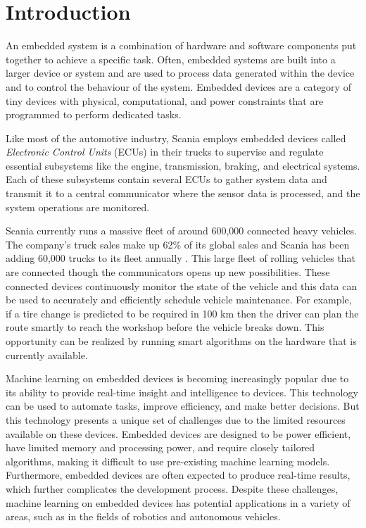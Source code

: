 \part{Introduction}

An embedded system is a combination of hardware and software components put together to achieve a specific task. Often, embedded systems are built into a larger device or system and are used to process data generated within the device and to control the behaviour of the system. Embedded devices are a category of tiny devices with physical, computational, and power constraints that are programmed to perform dedicated tasks.

Like most of the automotive industry, Scania employs embedded devices called \textit{Electronic Control Units} (ECUs) in their trucks to supervise and regulate essential subsystems like the engine, transmission, braking, and electrical systems. Each of these subsystems contain several ECUs to gather system data and transmit it to a central communicator where the sensor data is processed, and the system operations are monitored.

Scania currently runs a massive fleet of around 600,000 connected heavy vehicles. The company's truck sales make up 62\% of its global sales and Scania has been adding 60,000 trucks to its fleet annually \cite{scania-report}. This large fleet of rolling vehicles that are connected though the communicators opens up new possibilities. These connected devices continuously monitor the state of the vehicle and this data can be used to accurately and efficiently schedule vehicle maintenance. For example, if a tire change is predicted to be required in 100 km then the driver can plan the route smartly to reach the workshop before the vehicle breaks down. This opportunity can be realized by running smart algorithms on the hardware that is currently available.

Machine learning on embedded devices is becoming increasingly popular due to its ability to provide real-time insight and intelligence to devices. This technology can be used to automate tasks, improve efficiency, and make better decisions. But this technology presents a unique set of challenges due to the limited resources available on these devices. Embedded devices are designed to be power efficient, have limited memory and processing power, and require closely tailored algorithms, making it difficult to use pre-existing machine learning models. Furthermore, embedded devices are often expected to produce real-time results, which further complicates the development process. Despite these challenges, machine learning on embedded devices has potential applications in a variety of areas, such as in the fields of robotics and autonomous vehicles.

